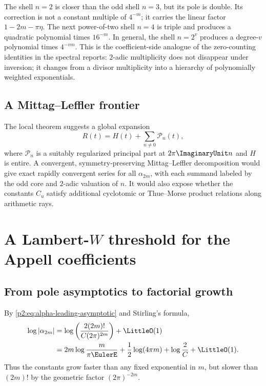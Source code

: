 \documentclass[11pt,oneside]{article}
\numberwithin{equation}{section}
\theoremstyle{definition}
\theoremstyle{remark}
\begin{document}
The shell $n=2$ is closer than the odd shell $n=3$, but its pole is double.  Its correction is not a
constant multiple of $4^{-m}$; it carries the linear factor $1-2m-\pi\eta$.  The next power-of-two
shell $n=4$ is triple and produces a quadratic polynomial times $16^{-m}$.  In general, the shell
$n=2^v$ produces a degree-$v$ polynomial times $4^{-vm}$.  This is the coefficient-side analogue
of the zero-counting identities in the spectral reports: $2$-adic multiplicity does not disappear
under inversion; it changes from a divisor multiplicity into a hierarchy of polynomially weighted
exponentials.

\subsection{A Mittag--Leffler frontier}

The local theorem suggests a global expansion
\begin{equation}
 R(t)=H(t)+\sum_{n\ne0}\mathcal P_n(t),
 \label{p2:eq:mittag-leffler-formal}
\end{equation}
where $\mathcal P_n$ is a suitably regularized principal part at $2\pi\ImaginaryUnit n$ and $H$ is entire.
A convergent, symmetry-preserving Mittag--Leffler decomposition would give exact rapidly convergent
series for all $\alpha_{2m}$, with each summand labeled by the odd core and $2$-adic valuation of
$n$.  It would also expose whether the constants $C_u$ satisfy additional cyclotomic or
Thue--Morse product relations along arithmetic rays.

\section{A Lambert-\texorpdfstring{$W$}{W} threshold for the Appell coefficients}
\label{p2:sec:lambert}

\subsection{From pole asymptotics to factorial growth}

By \eqref{p2:eq:alpha-leading-asymptotic} and Stirling's formula,
\begin{align}
 \log|\alpha_{2m}|
 &=\log\left(\frac{2(2m)!}{C(2\pi)^{2m}}\right)+\LittleO(1)
 \notag\\
 &=2m\log\frac{m}{\pi\EulerE}
 +\frac12\log(4\pi m)+\log\frac2C+\LittleO(1).
 \label{p2:eq:log-alpha-Stirling}
\end{align}
Thus the constants grow faster than any fixed exponential in $m$, but slower than $(2m)!$ by the
geometric factor $(2\pi)^{-2m}$.
\end{document}
